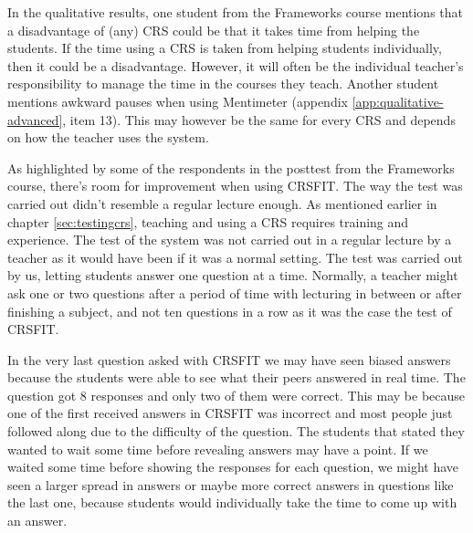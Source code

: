 
In the qualitative results, one student from the Frameworks course mentions that a disadvantage of (any) CRS could be that it takes time from helping the students. If the time using a CRS is taken from helping students individually, then it could be a disadvantage. However, it will often be the individual teacher's responsibility to manage the time in the courses they teach. Another student mentions awkward pauses when using Mentimeter (appendix \ref{app:qualitative-advanced}, item 13). This may however be the same for every CRS and depends on how the teacher uses the system. 




As highlighted by some of the respondents in the posttest from the Frameworks course, there's room for improvement when using CRSFIT. The way the test was carried out didn't resemble a regular lecture enough. As mentioned earlier in chapter \ref{sec:testingcrs}, teaching and using a CRS requires training and experience. The test of the system was not carried out in a regular lecture by a teacher as it would have been if it was a normal setting. The test was carried out by us, letting students answer one question at a time. Normally, a teacher might ask one or two questions after a period of time with lecturing in between or after finishing a subject, and not ten questions in a row as it was the case the test of CRSFIT.





In the very last question asked with CRSFIT we may have seen biased answers because the students were able to see what their peers answered in real time. The question got 8 responses and only two of them were correct. This may be because one of the first received answers in CRSFIT was incorrect and most people just followed along due to the difficulty of the question. The students that stated they wanted to wait some time before revealing answers may have a point. If we waited some time before showing the responses for each question, we might have seen a larger spread in answers or maybe more correct answers in questions like the last one, because students would individually take the time to come up with an answer. 



